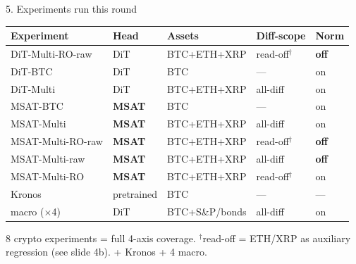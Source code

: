 \documentclass[aspectratio=169]{beamer}
\begin{document}
\begin{frame}{5. Experiments run this round}
\small\begin{center}\begin{tabular}{lllll}\toprule
Experiment & Head & Assets & Diff-scope & Norm \\ \midrule
DiT-Multi-RO-raw & DiT & BTC+ETH+XRP & read-off$^\dagger$ & \textbf{off} \\
DiT-BTC & DiT & BTC & --- & on \\
DiT-Multi & DiT & BTC+ETH+XRP & all-diff & on \\
MSAT-BTC & \textbf{MSAT} & BTC & --- & on \\
MSAT-Multi & \textbf{MSAT} & BTC+ETH+XRP & all-diff & on \\
MSAT-Multi-RO-raw & \textbf{MSAT} & BTC+ETH+XRP & read-off$^\dagger$ & \textbf{off} \\
MSAT-Multi-raw & \textbf{MSAT} & BTC+ETH+XRP & all-diff & \textbf{off} \\
MSAT-Multi-RO & \textbf{MSAT} & BTC+ETH+XRP & read-off$^\dagger$ & on \\
\midrule Kronos & pretrained & BTC & --- & --- \\
macro ($\times$4) & DiT & BTC+S\&P/bonds & all-diff & on \\
\bottomrule\end{tabular}\end{center}
\footnotesize 8 crypto experiments = full 4-axis coverage. $^\dagger$read-off = ETH/XRP as auxiliary regression (see slide 4b). + Kronos + 4 macro.\end{frame}
\end{document}
